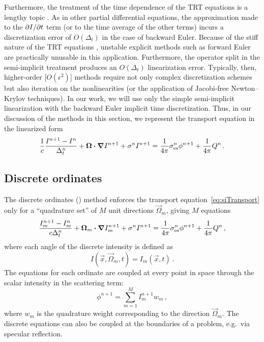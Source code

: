 Furthermore, the treatment of the time dependence of the TRT equations is a lengthy
topic \cite{Low2004}. As in other partial differential equations, the
approximation made to the
${\partial I}/{\partial t}$ term (or to the time average of the other terms) incurs a
discretization error of $O(\Delta_t)$ in the case of backward Euler.
Because of the stiff nature of the TRT equations \cite{Kno2003}, unstable explicit
methods such as forward Euler are practically unusable in this application.
Furthermore, the operator split in the semi-implicit treatment produces an
$O(\Delta_t)$ linearization error. Typically, then,
higher-order [$O(\epsilon^2)$] methods require not only complex discretization schemes but also
iteration on the nonlinearities (or the
application of Jacobi-free Newton--Krylov techniques). In our work, we will use
only the simple semi-implicit linearization with the backward Euler implicit time
discretization. Thus, in our discussion of the methods in this section, we
represent
the transport equation in the linearized form
\begin{equation}\label{eq:siTransport}
  \frac{1}{c} \frac{I^{n+1} - I^n}{\Delta_t^n}
  + \bm{\Omega} \bm{\cdot} \bm{\nabla} I^{n+1}
  + \sigma^n I^{n+1}
  = \frac{1}{4\pi} \sigma_\mathrm{es}^n \phi^{n+1}
  + \frac{1}{4\pi} Q^n\,.
\end{equation}

\subsection{Discrete ordinates}

The discrete ordinates (\SN) method enforces the transport
equation~\eqref{eq:siTransport} only for a ``quadrature set'' of $M$ unit
directions $\vec{\Omega}_m$, giving $M$ equations
\begin{equation}\label{eq:snTransport}
  \frac{I_{m}^{n+1} - I_{m}^n}{c \Delta_t^n}
  + \bm{\Omega}_{m} \bm{\cdot} \bm{\nabla} I_{m}^{n+1}
  + \sigma^n I^{n+1}
  = \frac{1}{4\pi} \sigma_\mathrm{es}^n \phi^{n+1}
  + \frac{1}{4\pi} Q^n\,,
\end{equation}
where each angle of the discrete intensity is defined as
\begin{equation*}
  I(\vec{x},\vec{\Omega}_m,t) = I_m(\vec{x},t)\,.
\end{equation*}
The equations for each ordinate are coupled at every point in space through the
scalar intensity in the scattering term:
\begin{equation*}
  \phi^{n+1} = \sum_{m=1}^M I_m^{n+1} w_m \,,
\end{equation*}
where $w_m$ is the quadrature weight corresponding to the direction
$\vec{\Omega}_m$.  The discrete equations can also be coupled at the boundaries
of a problem, e.g.~via specular reflection.

